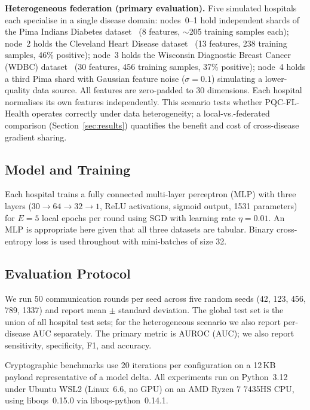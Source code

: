 \documentclass[conference]{IEEEtran}
\begin{document}
\textbf{Heterogeneous federation (primary evaluation).}
Five simulated hospitals each specialise in a single disease domain:
nodes~0--1 hold independent shards of the Pima Indians Diabetes
dataset~\cite{smith1988} (8 features, $\sim$205 training samples each);
node~2 holds the Cleveland Heart Disease
dataset~\cite{detrano1989} (13 features, 238 training samples, 46\%
positive); node~3 holds the Wisconsin Diagnostic Breast Cancer
(WDBC) dataset~\cite{street1993} (30 features, 456 training samples,
37\% positive); node~4 holds a third Pima shard with Gaussian
feature noise ($\sigma=0.1$) simulating a lower-quality data source.
All features are zero-padded to 30 dimensions.
Each hospital normalises its own features independently.
This scenario tests whether PQC-FL-Health operates correctly under
data heterogeneity; a local-vs.-federated comparison
(Section~\ref{sec:results}) quantifies the benefit and cost of
cross-disease gradient sharing.

\subsection{Model and Training}

Each hospital trains a fully connected multi-layer perceptron (MLP)
with three layers ($30 \to 64 \to 32 \to 1$, ReLU activations,
sigmoid output, 1531 parameters) for $E = 5$ local epochs per round
using SGD with learning rate $\eta = 0.01$.
An MLP is appropriate here given that all three datasets are tabular.
Binary cross-entropy loss is used throughout with mini-batches
of size 32.

\subsection{Evaluation Protocol}

We run 50 communication rounds per seed across five random seeds
(42, 123, 456, 789, 1337) and report mean $\pm$ standard deviation.
The global test set is the union of all hospital test sets; for the
heterogeneous scenario we also report per-disease AUC separately.
The primary metric is AUROC (AUC); we also report sensitivity,
specificity, F1, and accuracy.

Cryptographic benchmarks use 20 iterations per configuration on a
12\,KB payload representative of a model delta.
All experiments run on Python~3.12 under Ubuntu WSL2 (Linux~6.6,
no GPU) on an AMD Ryzen 7 7435HS CPU, using liboqs~0.15.0 via
liboqs-python~0.14.1.

\end{document}

